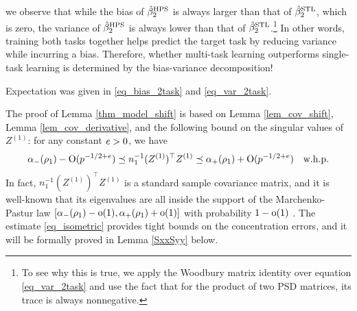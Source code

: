 we observe that while the bias of $\hat{\beta}_2^{\textup{HPS}}$ is always larger than that of $\hat{\beta}_2^{\textup{STL}}$, which is zero, the variance of $\hat{\beta}_2^{\textup{HPS}}$ is always lower than that of $\hat{\beta}_2^{\textup{STL}}$.\footnote{To see why this is true, we apply the Woodbury matrix identity over equation \eqref{eq_var_2task} and use the fact that for the product of two PSD matrices, its trace is always nonnegative.}
In other words, training both tasks together helps predict the target task by reducing variance while incurring a bias.
Therefore, whether multi-task learning outperforms single-task learning is determined by the bias-variance decomposition!

  Expectation was given in \eqref{eq_bias_2task} and \eqref{eq_var_2task}. 

The proof of Lemma \ref{thm_model_shift} is based on Lemma \ref{lem_cov_shift}, Lemma \ref{lem_cov_derivative}, and the following bound on the singular values of $Z^{(1)}$: for any constant ${\mathit{e}}>0$, we have
\begin{align}
\alpha_-(\rho_1) - \operatorname{O}(p^{-1/2+e})  \preceq {n_1^{-1}}{(Z^{(1)})^{\top} Z^{(1)}}  \preceq   \alpha_+(\rho_1) + \operatorname{O}(p^{-1/2+e}) \quad \text{w.h.p.}  \label{eq_isometric}
\end{align}
In fact, $n_1^{-1}(Z^{(1)})^{\top}Z^{(1)}$ is a standard sample covariance matrix, and it is well-known that its eigenvalues are all inside the support of the Marchenko-Pastur law $[\alpha_-(\rho_1)-\operatorname{o}(1) ,\alpha_+(\rho_1)+\operatorname{o}(1)]$ with probability $1-\operatorname{o}(1)$ \cite{No_outside}. The estimate \eqref{eq_isometric} provides tight bounds on the concentration errors, and it will be formally proved in Lemma \ref{SxxSyy} below.



